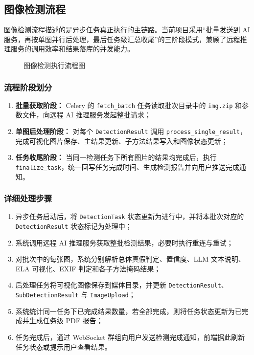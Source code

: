 \subsection{图像检测流程}
图像检测流程描述的是异步任务真正执行的主链路。当前项目采用“批量发送到 AI 服务，再按单图并行后处理，最后任务级汇总收尾”的三阶段模式，兼顾了远程推理服务的调用效率和结果落库的并发能力。

\begin{figure}[H]
    \centering
    \resizebox{0.98\textwidth}{!}{}
    \caption{图像检测执行流程图}
\end{figure}

\subsubsection{流程阶段划分}
\begin{enumerate}[leftmargin=2em]
    \item \textbf{批量获取阶段：} Celery 的 \texttt{fetch\_batch} 任务读取批次目录中的 \texttt{img.zip} 和参数文件，向远程 AI 推理服务发起整批请求；
    \item \textbf{单图后处理阶段：} 对每个 \texttt{DetectionResult} 调用 \texttt{process\_single\_result}，完成可视化图片保存、主结果更新、子方法结果写入和图像状态更新；
    \item \textbf{任务收尾阶段：} 当同一检测任务下所有图片的结果均完成后，执行 \texttt{finalize\_task}，统一回写任务完成时间、生成检测报告并向用户推送完成通知。
\end{enumerate}

\subsubsection{详细处理步骤}
\begin{enumerate}[leftmargin=2em]
    \item 异步任务启动后，将 \texttt{DetectionTask} 状态更新为进行中，并将本批次对应的 \texttt{DetectionResult} 状态标记为处理中；
    \item 系统调用远程 AI 推理服务获取整批检测结果，必要时执行重连与重试；
    \item 对批次中的每张图，系统分别解析总体真假判定、置信度、LLM 文本说明、ELA 可视化、EXIF 判定和各子方法掩码结果；
    \item 后处理任务将可视化图像保存到媒体目录，并更新 \texttt{DetectionResult}、\texttt{SubDetectionResult} 与 \texttt{ImageUpload}；
    \item 系统统计同一任务下已完成结果数量，若全部完成，则将任务状态更新为已完成并生成任务级 PDF 报告；
    \item 任务完成后，通过 WebSocket 群组向用户发送检测完成通知，前端据此刷新任务状态或提示用户查看结果。
\end{enumerate}

